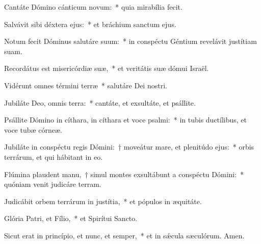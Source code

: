 \item Cantáte Dómino cánticum novum:~* quia mirabília fecit.

\item Salvávit sibi déxtera ejus:~* et bráchium sanctum ejus.

\item Notum fecit Dóminus salutáre suum:~* in conspéctu Géntium revelávit justítiam suam.

\item Recordátus est misericórdiæ suæ,~* et veritátis suæ dómui Israël.

\item Vidérunt omnes términi terræ~* salutáre Dei nostri.

\item Jubiláte Deo, omnis terra:~* cantáte, et exsultáte, et psállite.

\item Psállite Dómino in cíthara, in cíthara et voce psalmi:~* in tubis ductílibus, et voce tubæ córneæ.

\item Jubiláte in conspéctu regis Dómini:~† moveátur mare, et plenitúdo ejus:~* orbis terrárum, et qui hábitant in eo.

\item Flúmina plaudent manu,~† simul montes exsultábunt a conspéctu Dómini:~* quóniam venit judicáre terram.

\item Judicábit orbem terrárum in justítia,~* et pópulos in æquitáte.

\item Glória Patri, et Fílio,~* et Spirítui Sancto.

\item Sicut erat in princípio, et nunc, et semper,~* et in sǽcula sæculórum. Amen.

